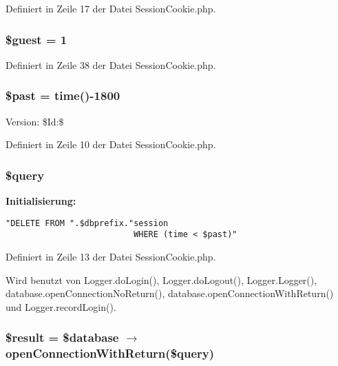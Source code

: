 Definiert in Zeile 17 der Datei SessionCookie.php.
\subsubsection{\setlength{\rightskip}{0pt plus 5cm}\$guest = 1}\label{SessionCookie_8php_d66623e413b7ca6fec85bd439ed77268}




Definiert in Zeile 38 der Datei SessionCookie.php.
\subsubsection{\setlength{\rightskip}{0pt plus 5cm}\$past = time()-1800}\label{SessionCookie_8php_a0ad92c842535d85be5cad3fe1d7f840}


\begin{Desc}
\item[Version:]\$Id:\$ \end{Desc}


Definiert in Zeile 10 der Datei SessionCookie.php.
\subsubsection{\setlength{\rightskip}{0pt plus 5cm}\$query}\label{SessionCookie_8php_f59a5f7cd609e592c41dc3643efd3c98}


\textbf{Initialisierung:}

\begin{Code}\begin{verbatim}"DELETE FROM ".$dbprefix."session
                          WHERE (time < $past)"
\end{verbatim}
\end{Code}


Definiert in Zeile 13 der Datei SessionCookie.php.

Wird benutzt von Logger.doLogin(), Logger.doLogout(), Logger.Logger(), database.openConnectionNoReturn(), database.openConnectionWithReturn() und Logger.recordLogin().
\subsubsection{\setlength{\rightskip}{0pt plus 5cm}\$result = \${\bf database} $\rightarrow$ openConnectionWithReturn(\$query)}\label{SessionCookie_8php_112ef069ddc0454086e3d1e6d8d55d07}




